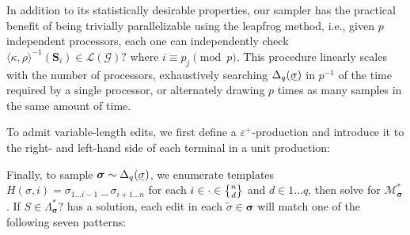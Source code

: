 \documentclass[sigplan,review,anonymous,acmsmall]{acmart}\settopmatter{printfolios=false,printccs=false,printacmref=false}
\begin{document}
In addition to its statistically desirable properties, our sampler has the practical benefit of being trivially parallelizable using the leapfrog method, i.e., given $p$ independent processors, each one can independently check $\langle\kappa, \rho\rangle^{-1}(\mathbf{S}_{i}) \in \mathcal{L}(\mathcal{G})?$ where $i \equiv p_j \pmod p$. This procedure linearly scales with the number of processors, exhaustively searching $\Delta_{q}(\err{\sigma})$ in $p^{-1}$ of the time required by a single processor, or alternately drawing $p$ times as many samples in the same amount of time.

To admit variable-length edits, we first define a $\varepsilon^+$-production and introduce it to the right- and left-hand side of each terminal in a unit production:\vspace{5pt}


Finally, to sample $\bm{\sigma}\sim\Delta_{q}(\err{\sigma})$, we enumerate templates $H(\sigma, i) = \sigma_{1\ldots i-1}\:\text{\_ \_}\:\sigma_{i+1\ldots n}$ for each $i \in \cdot \in \stirlingii{n}{d}$ and $d \in 1\ldots q$, then solve for $\mathcal{M}_{\bm\sigma}^*$. If $S \in \Lambda^*_{\bm\sigma}?$ has a solution, each edit in each $\tilde{\sigma} \in \bm\sigma$ will match one of the following seven patterns:\vspace{-10pt}
\end{document}
